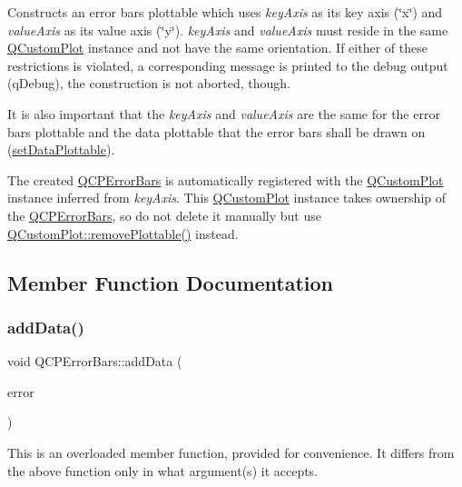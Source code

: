Constructs an error bars plottable which uses {\itshape key\+Axis} as its key axis (\char`\"{}x\char`\"{}) and {\itshape value\+Axis} as its value axis (\char`\"{}y\char`\"{}). {\itshape key\+Axis} and {\itshape value\+Axis} must reside in the same \hyperlink{classQCustomPlot}{Q\+Custom\+Plot} instance and not have the same orientation. If either of these restrictions is violated, a corresponding message is printed to the debug output (q\+Debug), the construction is not aborted, though.

It is also important that the {\itshape key\+Axis} and {\itshape value\+Axis} are the same for the error bars plottable and the data plottable that the error bars shall be drawn on (\hyperlink{classQCPErrorBars_aabb42a964cfbf780cd1c79850c7cd989}{set\+Data\+Plottable}).

The created \hyperlink{classQCPErrorBars}{Q\+C\+P\+Error\+Bars} is automatically registered with the \hyperlink{classQCustomPlot}{Q\+Custom\+Plot} instance inferred from {\itshape key\+Axis}. This \hyperlink{classQCustomPlot}{Q\+Custom\+Plot} instance takes ownership of the \hyperlink{classQCPErrorBars}{Q\+C\+P\+Error\+Bars}, so do not delete it manually but use \hyperlink{classQCustomPlot_af3dafd56884208474f311d6226513ab2}{Q\+Custom\+Plot\+::remove\+Plottable()} instead. 

\subsection{Member Function Documentation}
\mbox{\label{classQCPErrorBars_aae296ad9817b3fa418db284af81cecf8}} 
\subsubsection{\texorpdfstring{add\+Data()}{addData()}\hspace{0.1cm}{\footnotesize\ttfamily [1/4]}}
{\footnotesize\ttfamily void Q\+C\+P\+Error\+Bars\+::add\+Data (\begin{DoxyParamCaption}\item[{const Q\+Vector$<$ double $>$ \&}]{error }\end{DoxyParamCaption})}

This is an overloaded member function, provided for convenience. It differs from the above function only in what argument(s) it accepts.

